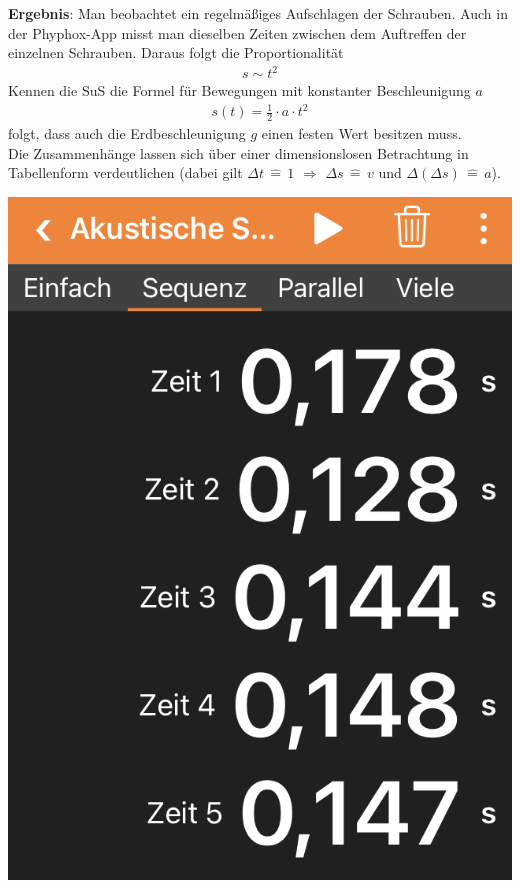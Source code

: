 \documentclass[../main.tex]{subfiles}
\begin{document}
\begin{tcolorbox}
\begin{minipage}[]{0.7\textwidth}
        \vspace{0.5cm}
        \textbf{Ergebnis}: Man beobachtet ein regelmäßiges Aufschlagen der Schrauben. Auch in der Phyphox-App misst man dieselben Zeiten zwischen dem Auftreffen der einzelnen Schrauben. Daraus folgt die Proportionalität
        \begin{align*}
            s \sim t^2
        \end{align*}
        Kennen die SuS die Formel für Bewegungen mit konstanter Beschleunigung $a$
        \begin{align*}
            s(t) = \frac{1}{2} \cdot a \cdot  t^2
        \end{align*}
        folgt, dass auch die Erdbeschleunigung $g$ einen festen Wert besitzen muss.\\
        Die Zusammenhänge lassen sich über einer dimensionslosen Betrachtung in Tabellenform verdeutlichen (dabei gilt $\Delta t \, \widehat{=} \, 1$ $\Rightarrow$ $\Delta s \,\widehat{=}\, v$ und $\Delta(\Delta s)\,\widehat{=}\,a$).
    \end{minipage}
    \hspace{0.2cm}
    \begin{minipage}[]{0.2\textwidth}
        \vspace{1.0cm} 
        \includegraphics[width=1.31\textwidth]{img/app}


\end{minipage}
\end{tcolorbox}
\end{document}
